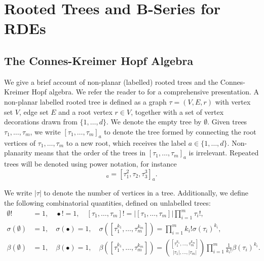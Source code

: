 \documentclass{article}
\theoremstyle{definition}
\theoremstyle{remark}
\begin{document}
\section{Rooted Trees and B-Series for RDEs}
\subsection{The Connes-Kreimer Hopf Algebra}

We give a brief account of non-planar (labelled) rooted trees and the Connes-Kreimer Hopf algebra. We refer the reader to \cite{hoffman2003hopf} for a comprehensive presentation. A non-planar labelled rooted tree is defined as a graph $\tau = (V, E, r)$ with vertex set $V$, edge set $E$ and a root vertex $r \in V$, together with a set of vertex decorations drawn from $\{1, \ldots, d\}$. We denote the empty tree by $\emptyset$. Given trees $\tau_1, \ldots, \tau_m$, we write $[\tau_1, \ldots, \tau_m]_a$ to denote the tree formed by connecting the root vertices of $\tau_1, \ldots, \tau_m$ to a new root, which receives the label $a \in \{1, \ldots, d\}$. Non-planarity means that the order of the trees in $[\tau_1, \ldots, \tau_m]_a$ is irrelevant. Repeated trees will be denoted using power notation, for instance
\begin{equation*}
    [\tau_1,\tau_1, \tau_2, \tau_3, \tau_3, \tau_3]_a = [\tau_1^2, \tau_2, \tau_3^3]_a.
\end{equation*}

We write $|\tau|$ to denote the number of vertices in a tree. Additionally, we define the following combinatorial quantities, defined on unlabelled trees:
\begin{align*}
    \emptyset! &= 1, \quad \bullet! = 1, \quad [\tau_1, \ldots, \tau_m]! = |[\tau_1, \ldots, \tau_m]| \prod_{i=1}^m \tau_i!,\\
    \sigma(\emptyset) &= 1, \quad \sigma(\bullet) = 1, \quad \sigma([\tau_1^{k_1}, \ldots, \tau_m^{k_m}]) = \prod_{i=1}^m k_i! \sigma(\tau_i)^{k_i},\\
    \beta(\emptyset) &= 1, \quad \beta(\bullet) = 1, \quad \beta([\tau_1^{k_1}, \ldots, \tau_m^{k_m}]) = \binom{[\tau_1^{k_1}, \ldots, \tau_m^{k_m}]}{|\tau_1|, \ldots, |\tau_m|}\prod_{i=1}^m \frac{1}{k_i!} \beta(\tau_i)^{k_i}.
\end{align*}
\end{document}
